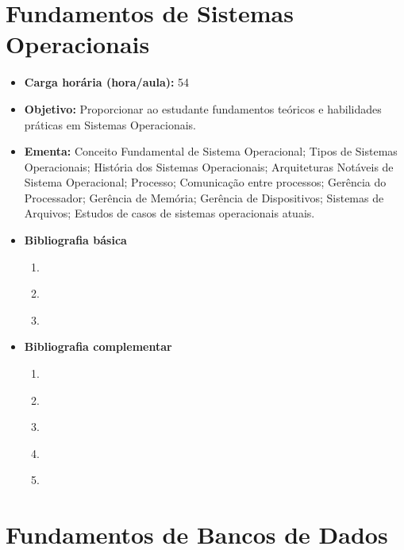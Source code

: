 \documentclass[11pt,fleqn]{book} %
\begin{document}
\section{Fundamentos de Sistemas Operacionais}\label{2_sistop}
\begin{itemize}
	\item \textbf{Carga horária (hora/aula):} 54
	\item \textbf{Objetivo:} Proporcionar ao estudante fundamentos teóricos e habilidades práticas em Sistemas Operacionais.
	\item \textbf{Ementa:} 
	Conceito Fundamental de Sistema Operacional; 
	Tipos de Sistemas Operacionais; 
	História dos Sistemas Operacionais; 
	Arquiteturas Notáveis de Sistema Operacional; 
	Processo; 
	Comunicação entre processos; 
	Gerência do Processador; 
	Gerência de Memória; 
	Gerência de Dispositivos; 
	Sistemas de Arquivos; 
	Estudos de casos de sistemas operacionais atuais.
	\item \textbf{Bibliografia básica}
	\begin{enumerate}
		\item \cite{tanenbaum_2010}
		\item \cite{laureano_olsen_2010}
		\item \cite{machado_maia_2013}
		
		
	\end{enumerate}
	\item \textbf{Bibliografia complementar}
	\begin{enumerate}
		\item \cite{tanenbaum_2008}
		\item \cite{brookshear_lee_oliveira}
		\item \cite{deitel_deitel_choffnes_2010}
		\item \cite{oliveira_romulo_2010}
		\item \cite{smith_2004}
	\end{enumerate}	
\end{itemize}


\newpage
\section{Fundamentos de Bancos de Dados}\label{2_bancodados}
\end{document}
